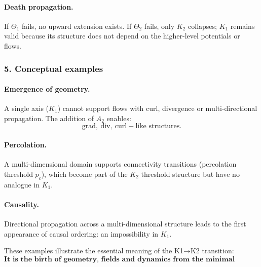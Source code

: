 \paragraph{Death propagation.}
If $\Theta_1$ fails, no upward extension exists.  
If $\Theta_2$ fails, only $K_2$ collapses; $K_1$ remains valid because
its structure does not depend on the higher-level potentials or flows.

\subsubsection{5. Conceptual examples}

\paragraph{Emergence of geometry.}
A single axis ($K_1$) cannot support flows with curl, divergence or
multi-directional propagation. The addition of $A_2$ enables:
\[
\mathrm{grad},\ \mathrm{div},\ \mathrm{curl}-\text{like structures}.
\]

\paragraph{Percolation.}
A multi-dimensional domain supports connectivity transitions
(percolation threshold $p_c$), which become part of the $K_2$ threshold
structure but have no analogue in $K_1$.

\paragraph{Causality.}
Directional propagation across a multi-dimensional structure leads to
the first appearance of causal ordering: an impossibility in $K_1$.

These examples illustrate the essential meaning of the K1→K2 transition:
\[
\textbf{It is the birth of geometry, fields and dynamics from the minimal
representational continuum.}
\]
